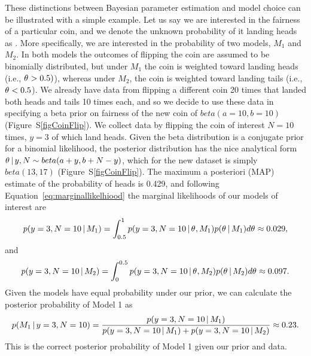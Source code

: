 \begin{linenomath}
These distinctions between Bayesian parameter estimation and model choice can
be illustrated with a simple example.
Let us say we are interested in the fairness of a particular coin, and we
denote the unknown probability of it landing heads as \myTheta{}.
More specifically, we are interested in the probability of two models, $M_1$
and $M_2$.
In both models the outcomes of flipping the coin are assumed to be binomially
distributed, but under $M_1$ the coin is weighted toward landing heads (i.e.,
$\theta_{} > 0.5)$), whereas under $M_2$, the coin is weighted toward landing
tails (i.e., $\theta_{} < 0.5$).
We already have data from flipping a different coin 20 times that landed both
heads and tails 10 times each, and so we decide to use these data in specifying
a beta prior on fairness of the new coin of $beta(a=10, b=10)$
(Figure~S\ref{figCoinFlip}).
We collect data by flipping the coin of interest $N=10$ times, $y=3$ of which
land heads.
Given the beta distribution is a conjugate prior for a binomial likelihood, the
posterior distribution has the nice analytical form $\theta \,|\, y,N \sim
beta(a + y, b + N - y)$, which for the new dataset is simply $beta(13, 17)$
(Figure~S\ref{figCoinFlip}).
The maximum a posteriori (MAP) estimate of the probability of heads is 0.429,
and following Equation~\ref{eq:marginallikelhiood} the marginal likelihoods of
our models of interest are
\begin{equation}
    p(y=3, N=10 \,|\, M_1) = \int_{0.5}^{1} p(y=3, N=10 \,|\,
    \theta_{}, M_1)p(\theta_{} \,|\, M_1) d\theta_{} \approx 0.029,
\end{equation}
and
\begin{equation}
    p(y=3, N=10 \,|\, M_2) = \int_{0}^{0.5} p(y=3, N=10 \,|\,
    \theta_{}, M_2)p(\theta_{} \,|\, M_2) d\theta_{} \approx 0.097.
\end{equation}
Given the models have equal probability under our prior, we can calculate the
posterior probability of Model 1 as
\begin{equation}
    p(M_1 \,|\, y=3, N=10) = \frac{p(y=3, N=10 \,|\, M_1)}{p(y=3, N=10 \,|\,
    M_1) + p(y=3, N=10 \,|\, M_2)} \approx 0.23.
\end{equation}
This is the correct posterior probability of Model 1 given our prior
and data.
\end{linenomath}

